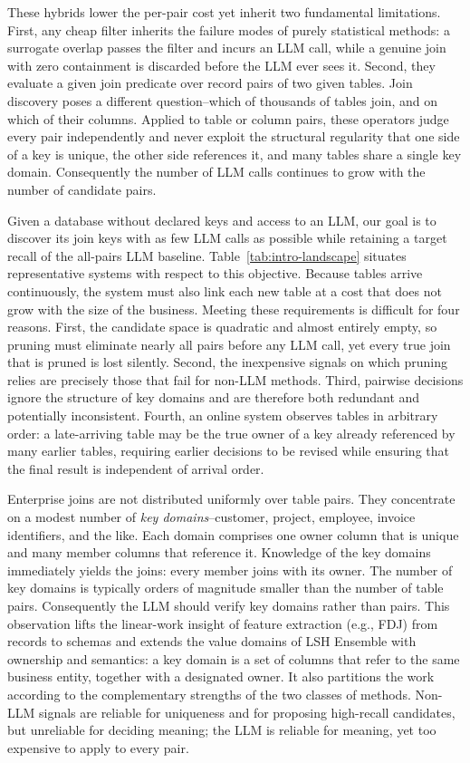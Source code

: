 These hybrids lower the per-pair cost yet inherit two fundamental limitations. First, any cheap filter inherits the failure modes of purely statistical methods: a surrogate overlap passes the filter and incurs an LLM call, while a genuine join with zero containment is discarded before the LLM ever sees it. Second, they evaluate a given join predicate over record pairs of two given tables. Join discovery poses a different question--which of thousands of tables join, and on which of their columns. Applied to table or column pairs, these operators judge every pair independently and never exploit the structural regularity that one side of a key is unique, the other side references it, and many tables share a single key domain. Consequently the number of LLM calls continues to grow with the number of candidate pairs.



Given a database without declared keys and access to an LLM, our goal is to discover its join keys with as few LLM calls as possible while retaining a target recall of the all-pairs LLM baseline. Table~\ref{tab:intro-landscape} situates representative systems with respect to this objective. Because tables arrive continuously, the system must also link each new table at a cost that does not grow with the size of the business. Meeting these requirements is difficult for four reasons. First, the candidate space is quadratic and almost entirely empty, so pruning must eliminate nearly all pairs before any LLM call, yet every true join that is pruned is lost silently. Second, the inexpensive signals on which pruning relies are precisely those that fail for non-LLM methods. Third, pairwise decisions ignore the structure of key domains and are therefore both redundant and potentially inconsistent. Fourth, an online system observes tables in arbitrary order: a late-arriving table may be the true owner of a key already referenced by many earlier tables, requiring earlier decisions to be revised while ensuring that the final result is independent of arrival order.

Enterprise joins are not distributed uniformly over table pairs. They concentrate on a modest number of \emph{key domains}--customer, project, employee, invoice identifiers, and the like. Each domain comprises one owner column that is unique and many member columns that reference it. Knowledge of the key domains immediately yields the joins: every member joins with its owner. The number of key domains is typically orders of magnitude smaller than the number of table pairs. Consequently the LLM should verify key domains rather than pairs. This observation lifts the linear-work insight of feature extraction (e.g., FDJ) from records to schemas and extends the value domains of LSH Ensemble with ownership and semantics: a key domain is a set of columns that refer to the same business entity, together with a designated owner. It also partitions the work according to the complementary strengths of the two classes of methods. Non-LLM signals are reliable for uniqueness and for proposing high-recall candidates, but unreliable for deciding meaning; the LLM is reliable for meaning, yet too expensive to apply to every pair.


